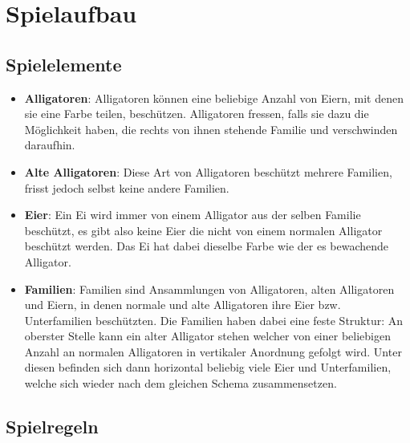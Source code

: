 \chapter{Spielaufbau}

\section{Spielelemente}
	
	\begin{itemize}
	
	\item \textbf{Alligatoren}: Alligatoren können eine beliebige Anzahl von Eiern, mit denen sie eine Farbe teilen, beschützen. Alligatoren fressen, falls sie dazu die Möglichkeit haben, die rechts von ihnen stehende Familie und verschwinden daraufhin.
	
	\item \textbf{Alte Alligatoren}: Diese Art von Alligatoren beschützt mehrere Familien, frisst jedoch selbst keine andere Familien.
	
	\item \textbf{Eier}: Ein Ei wird immer von einem Alligator aus der selben Familie beschützt, es gibt also keine Eier die nicht von einem normalen Alligator beschützt werden. Das Ei hat dabei dieselbe Farbe wie der es bewachende Alligator.
	
	\item \textbf{Familien}: Familien sind Ansammlungen von Alligatoren, alten Alligatoren und Eiern, in denen normale und alte Alligatoren ihre Eier bzw. Unterfamilien beschützten. Die Familien haben dabei eine feste Struktur: An oberster Stelle kann ein alter Alligator stehen welcher von einer beliebigen Anzahl an normalen Alligatoren in vertikaler Anordnung gefolgt wird. Unter diesen befinden sich dann horizontal beliebig viele Eier und Unterfamilien, welche sich wieder nach dem gleichen Schema zusammensetzen.
	
	\end{itemize}	
	
\section{Spielregeln}
	
